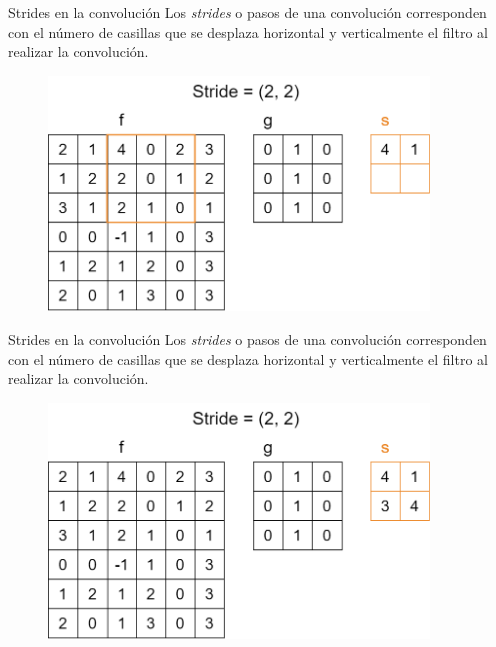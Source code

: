\begin{frame}{Strides en la convolución}
Los \alert{\textit{strides}} o pasos de una convolución corresponden con el número de casillas que se desplaza \alert{horizontal} y \alert{verticalmente} el filtro al realizar la convolución.

\begin{figure}
    \centering
    \includegraphics[width=0.9\textwidth]{Slides/figures/Tema 2/Strides2x2_3.png}
\end{figure}
\end{frame}

\begin{frame}{Strides en la convolución}
Los \alert{\textit{strides}} o pasos de una convolución corresponden con el número de casillas que se desplaza \alert{horizontal} y \alert{verticalmente} el filtro al realizar la convolución.

\begin{figure}
    \centering
    \includegraphics[width=0.9\textwidth]{Slides/figures/Tema 2/Strides2x2_Res.png}
\end{figure}
\end{frame}

